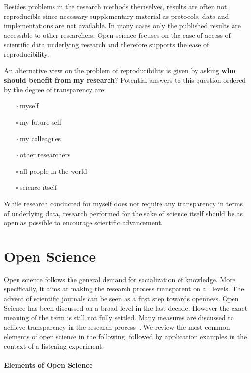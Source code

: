 \documentclass[a4paper, 10pt, twocolumn]{article}
\begin{document}
Besides problems in the research methods themselves, results are often not reproducible since 
necessary supplementary material as protocols, data and implementations are not available. In 
many cases only the published results are accessible to other researchers. Open science 
focuses on the ease of access of scientific data underlying research and therefore supports the ease of reproducibility.

An alternative view on the problem of reproducibility is given by asking 
\textbf{who should benefit from my research}? Potential answers to this question ordered by 
the degree of transparency are:
\begin{itemize}
\item[$\square$] myself
\item[$\square$] my future self
\item[$\square$] my colleagues
\item[$\square$] other researchers
\item[$\square$] all people in the world
\item[$\square$] science itself
\end{itemize}
While research conducted for myself does not require any transparency in terms
of underlying data, research performed for the sake of science itself should be
as open as possible to encourage scientific advancement.


\section*{Open Science} \label{sec:open_science} 

Open science follows the general demand for socialization of knowledge. More specifically, 
it aims at making the research process transparent on all levels. The advent of scientific 
journals can be seen as a first step towards openness. Open Science has been discussed on
a broad level in the last decade. However the exact meaning of the term is still not fully 
settled. Many measures are discussed to achieve transparency in the research process~\cite{Pontika15:ACM,Reproducibility15:AMS,Albagli15:Book,Vrana15:MIPRO,Kraker11:TEL}. 
We review the most common elements of open science in the following, followed by application 
examples in the context of a listening experiment.


\paragraph*{Elements of Open Science}
\end{document}
